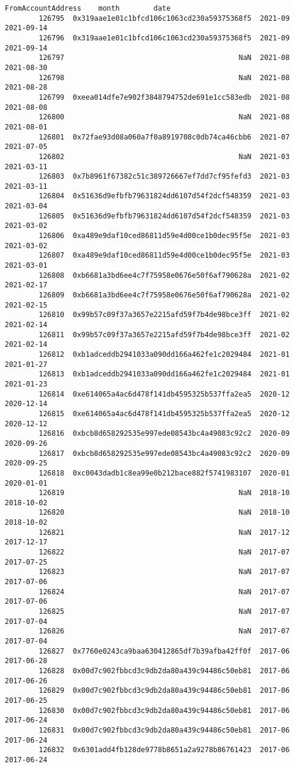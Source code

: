 \documentclass[11pt]{article}
\begin{document}
\begin{Verbatim}[commandchars=\\\{\}]
                                        FromAccountAddress    month        date  
        126795  0x319aae1e01c1bfcd106c1063cd230a59375368f5  2021-09  2021-09-14  
        126796  0x319aae1e01c1bfcd106c1063cd230a59375368f5  2021-09  2021-09-14  
        126797                                         NaN  2021-08  2021-08-30  
        126798                                         NaN  2021-08  2021-08-28  
        126799  0xeea014dfe7e902f3848794752de691e1cc583edb  2021-08  2021-08-08  
        126800                                         NaN  2021-08  2021-08-01  
        126801  0x72fae93d08a060a7f0a8919708c0db74ca46cbb6  2021-07  2021-07-05  
        126802                                         NaN  2021-03  2021-03-11  
        126803  0x7b8961f67382c51c389726667ef7dd7cf95fefd3  2021-03  2021-03-11  
        126804  0x51636d9efbfb79631824dd6107d54f2dcf548359  2021-03  2021-03-04  
        126805  0x51636d9efbfb79631824dd6107d54f2dcf548359  2021-03  2021-03-02  
        126806  0xa489e9daf10ced86811d59e4d00ce1b0dec95f5e  2021-03  2021-03-02  
        126807  0xa489e9daf10ced86811d59e4d00ce1b0dec95f5e  2021-03  2021-03-01  
        126808  0xb6681a3bd6ee4c7f75958e0676e50f6af790628a  2021-02  2021-02-17  
        126809  0xb6681a3bd6ee4c7f75958e0676e50f6af790628a  2021-02  2021-02-15  
        126810  0x99b57c09f37a3657e2215afd59f7b4de98bce3ff  2021-02  2021-02-14  
        126811  0x99b57c09f37a3657e2215afd59f7b4de98bce3ff  2021-02  2021-02-14  
        126812  0xb1adceddb2941033a090dd166a462fe1c2029484  2021-01  2021-01-27  
        126813  0xb1adceddb2941033a090dd166a462fe1c2029484  2021-01  2021-01-23  
        126814  0xe614065a4ac6d478f141db4595325b537ffa2ea5  2020-12  2020-12-14  
        126815  0xe614065a4ac6d478f141db4595325b537ffa2ea5  2020-12  2020-12-12  
        126816  0xbcb8d658292535e997ede08543bc4a49083c92c2  2020-09  2020-09-26  
        126817  0xbcb8d658292535e997ede08543bc4a49083c92c2  2020-09  2020-09-25  
        126818  0xc0043dadb1c8ea99e0b212bace882f5741983107  2020-01  2020-01-01  
        126819                                         NaN  2018-10  2018-10-02  
        126820                                         NaN  2018-10  2018-10-02  
        126821                                         NaN  2017-12  2017-12-17  
        126822                                         NaN  2017-07  2017-07-25  
        126823                                         NaN  2017-07  2017-07-06  
        126824                                         NaN  2017-07  2017-07-06  
        126825                                         NaN  2017-07  2017-07-04  
        126826                                         NaN  2017-07  2017-07-04  
        126827  0x7760e0243ca9baa630412865df7b39afba42ff0f  2017-06  2017-06-28  
        126828  0x00d7c902fbbcd3c9db2da80a439c94486c50eb81  2017-06  2017-06-26  
        126829  0x00d7c902fbbcd3c9db2da80a439c94486c50eb81  2017-06  2017-06-25  
        126830  0x00d7c902fbbcd3c9db2da80a439c94486c50eb81  2017-06  2017-06-24  
        126831  0x00d7c902fbbcd3c9db2da80a439c94486c50eb81  2017-06  2017-06-24  
        126832  0x6301add4fb128de9778b8651a2a9278b86761423  2017-06  2017-06-24  
\end{Verbatim}
            
\end{document}
